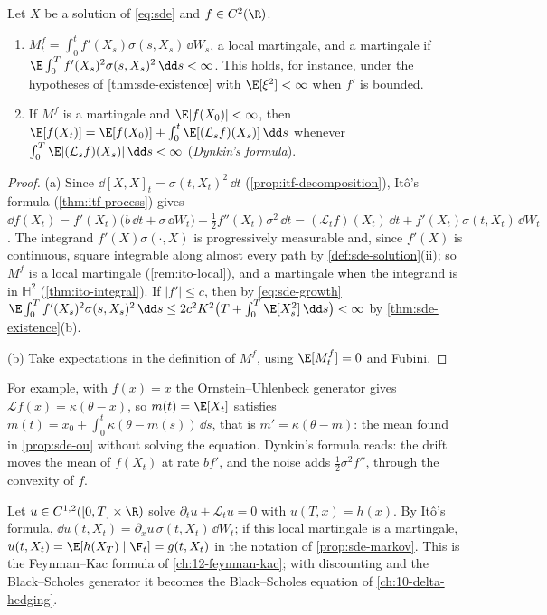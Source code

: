 \begin{proposition}\label{prop:sde-dynkin}
Let $X$ be a solution of \eqref{eq:sde} and $f\in C^2(\R)$.
\begin{enumerate}[label=(\alph*)]
  \item $M^f_t=\int_0^tf'(X_s)\sigma(s,X_s)\,\dd W_s$, a local martingale, and a martingale if
    $\E\int_0^Tf'(X_s)^2\sigma(s,X_s)^2\,\dd s<\infty$. This holds, for instance, under the
    hypotheses of \cref{thm:sde-existence} with $\E[\xi^2]<\infty$ when $f'$ is bounded.
  \item If $M^f$ is a martingale and $\E|f(X_0)|<\infty$, then
    $\E[f(X_t)]=\E[f(X_0)]+\int_0^t\E[(\mathcal L_sf)(X_s)]\,\dd s$ whenever
    $\int_0^T\E|(\mathcal L_sf)(X_s)|\,\dd s<\infty$ (\emph{Dynkin's formula}).
\end{enumerate}
\end{proposition}

\begin{proof}
(a) Since $\dd[X,X]_t=\sigma(t,X_t)^2\,\dd t$ (\cref{prop:itf-decomposition}), It\^o's
formula (\cref{thm:itf-process}) gives
$\dd f(X_t)=f'(X_t)\big(b\,\dd t+\sigma\,\dd W_t\big)+\frac12f''(X_t)\sigma^2\,\dd t
=(\mathcal L_tf)(X_t)\,\dd t+f'(X_t)\sigma(t,X_t)\,\dd W_t$. The integrand $f'(X)\sigma(\cdot,X)$
is progressively measurable and, since $f'(X)$ is continuous, square integrable along almost
every path by \cref{def:sde-solution}(ii); so $M^f$ is a local martingale
(\cref{rem:ito-local}), and a martingale when the integrand is in $\mathbb H^2$
(\cref{thm:ito-integral}). If $|f'|\le c$, then by \eqref{eq:sde-growth}
$\E\int_0^Tf'(X_s)^2\sigma(s,X_s)^2\,\dd s\le2c^2K^2\big(T+\int_0^T\E[X_s^2]\,\dd s\big)<\infty$
by \cref{thm:sde-existence}(b).

(b) Take expectations in the definition of $M^f$, using $\E[M^f_t]=0$ and Fubini.
\end{proof}

For example, with $f(x)=x$ the Ornstein--Uhlenbeck generator gives
$\mathcal Lf(x)=\kappa(\theta-x)$, so $m(t)=\E[X_t]$ satisfies
$m(t)=x_0+\int_0^t\kappa(\theta-m(s))\,\dd s$, that is $m'=\kappa(\theta-m)$: the mean
found in \cref{prop:sde-ou} without solving the equation. Dynkin's formula reads: the drift
moves the mean of $f(X_t)$ at rate $bf'$, and the noise adds $\frac12\sigma^2f''$, through the
convexity of $f$.

\begin{remark}\label{rem:sde-pde}
Let $u\in C^{1,2}([0,T]\times\R)$ solve $\partial_tu+\mathcal L_tu=0$ with $u(T,x)=h(x)$.
By It\^o's formula, $\dd u(t,X_t)=\partial_xu\,\sigma(t,X_t)\,\dd W_t$; if this local
martingale is a martingale, $u(t,X_t)=\E[h(X_T)\mid\F_t]=g(t,X_t)$ in the notation of
\cref{prop:sde-markov}. This is the Feynman--Kac formula of
\cref{ch:12-feynman-kac}; with discounting and the Black--Scholes generator it becomes the
Black--Scholes equation of \cref{ch:10-delta-hedging}.
\end{remark}


